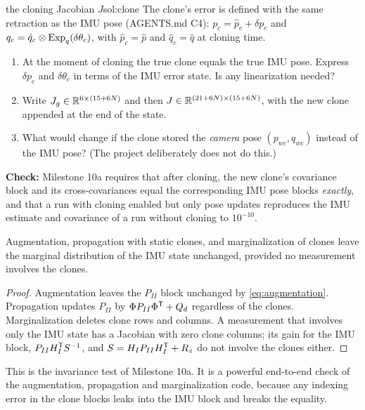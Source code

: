 \begin{derivex}{the cloning Jacobian $J$}{sol:clone}
The clone's error is defined with the same retraction as the IMU pose (AGENTS.md C4): $p_c = \hat p_c + \delta p_c$ and
$q_c = \hat q_c\otimes\operatorname{Exp}_q(\delta\theta_c)$, with $\hat p_c = \hat p$ and $\hat q_c = \hat q$ at cloning time.
\begin{enumerate}
  \item At the moment of cloning the true clone equals the true IMU pose. Express $\delta p_c$ and $\delta\theta_c$ in terms of the IMU
        error state. Is any linearization needed?
  \item Write $J_g \in \mathbb{R}^{6\times(15+6N)}$ and then $J \in \mathbb{R}^{(21+6N)\times(15+6N)}$, with the new clone appended at the end of the
        state.
  \item What would change if the clone stored the \emph{camera} pose $(p_{wc}, q_{wc})$ instead of the IMU pose? (The project
        deliberately does not do this.)
\end{enumerate}
\textbf{Check:} Milestone 10a requires that after cloning, the new clone's covariance block and its cross-covariances equal the
corresponding IMU pose blocks \emph{exactly}, and that a run with cloning enabled but only pose updates reproduces the
IMU estimate and covariance of a run without cloning to $10^{-10}$.
\end{derivex}

\begin{proposition}
\label{prop:clone-invariance}
Augmentation, propagation with static clones, and marginalization of clones leave the marginal distribution of the IMU state
unchanged, provided no measurement involves the clones.
\end{proposition}
\begin{proof}
Augmentation leaves the $P_{II}$ block unchanged by \eqref{eq:augmentation}. Propagation updates $P_{II}$ by $\Phi P_{II}\Phi^{\mathsf{T}} + Q_d$
regardless of the clones. Marginalization deletes clone rows and columns. A measurement that involves only the IMU state
has a Jacobian with zero clone columns; its gain for the IMU block, $P_{II}H_I^{\mathsf{T}} S^{-1}$, and $S = H_IP_{II}H_I^{\mathsf{T}} + R_z$ do not
involve the clones either.
\end{proof}

This is the invariance test of Milestone 10a. It is a powerful end-to-end check of the augmentation, propagation and
marginalization code, because any indexing error in the clone blocks leaks into the IMU block and breaks the equality.

